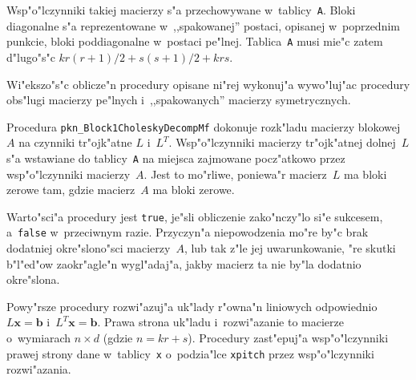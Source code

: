 Wsp"o"lczynniki takiej macierzy s"a przechowywane w~tablicy~\texttt{A}.
Bloki diagonalne s"a reprezentowane w~,,spakowanej'' postaci, opisanej
w~poprzednim punkcie, bloki poddiagonalne w~postaci pe"lnej.
Tablica~\texttt{A} musi mie"c zatem d"lugo"s"c $kr(r+1)/2+s(s+1)/2+krs$.

Wi"ekszo"s"c oblicze"n procedury opisane ni"rej wykonuj"a wywo"luj"ac
procedury obs"lugi macierzy pe"lnych i~,,spakowanych'' macierzy
symetrycznych.

\vspace{\bigskipamount}

\vspace{\bigskipamount}
\begin{sloppypar}
Procedura \texttt{pkn\_Block1CholeskyDecompMf} dokonuje rozk"ladu
macierzy blokowej~$A$ na czynniki tr"ojk"atne $L$ i~$L^T$.
Wsp"o"lczynniki macierzy tr"ojk"atnej dolnej~$L$ s"a wstawiane do
tablicy~\texttt{A} na miejsca zajmowane pocz"atkowo przez wsp"o"lczynniki
macierzy~$A$. Jest to mo"rliwe, poniewa"r macierz~$L$ ma bloki zerowe tam,
gdzie macierz~$A$ ma bloki zerowe.%
\end{sloppypar}

Warto"sci"a procedury jest \texttt{true}, je"sli obliczenie zako"nczy"lo
si"e sukcesem, a~\texttt{false} w~przeciwnym razie. Przyczyn"a
niepowodzenia mo"re by"c brak dodatniej okre"slono"sci macierzy~$A$,
lub tak z"le jej uwarunkowanie, "re skutki b"l"ed"ow zaokr"agle"n
wygl"adaj"a, jakby macierz ta nie by"la dodatnio okre"slona.

\vspace{\bigskipamount}
Powy"rsze procedury rozwi"azuj"a uk"lady r"owna"n liniowych odpowiednio
$L\bm{x}=\bm{b}$ i~$L^T\bm{x}=\bm{b}$. Prawa strona uk"ladu i~rozwi"azanie
to macierze o~wymiarach $n\times d$ (gdzie $n=kr+s$). Procedury zast"epuj"a
wsp"o"lczynniki prawej strony dane w~tablicy~\texttt{x} o~podzia"lce
\texttt{xpitch} przez wsp"o"lczynniki rozwi"azania.

